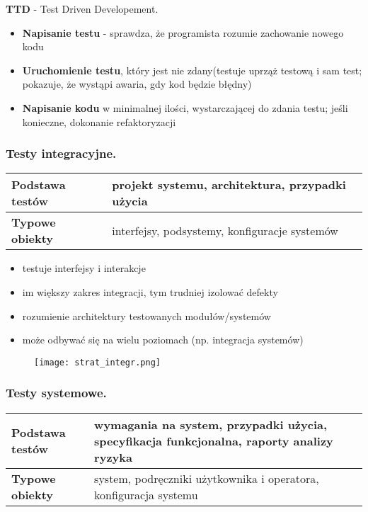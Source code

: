 \documentclass[../main.tex]{subfiles}
\begin{document}
    \textbf{TTD} - Test Driven Developement.
    \begin{itemize}
        \item \textbf{Napisanie testu} - sprawdza, że programista rozumie zachowanie nowego kodu
        \item \textbf{Uruchomienie testu}, który jest nie zdany(testuje uprząż testową i sam test; pokazuje,
        że wystąpi awaria, gdy kod będzie błędny)
        \item \textbf{Napisanie kodu} w minimalnej ilości, wystarczającej do zdania testu; jeśli
        konieczne, dokonanie refaktoryzacji
    \end{itemize}

    \subsubsection{Testy integracyjne.}
    \begin{tabular}{|p{3cm}|p{13cm}|}
        \hline
        \textbf{Podstawa testów} & projekt systemu, architektura, przypadki użycia\\
        \hline
        \textbf{Typowe obiekty} & interfejsy, podsystemy, konfiguracje systemów\\
        \hline
    \end{tabular}

    \begin{itemize}
        \item testuje interfejsy i interakcje
        \item im większy zakres integracji, tym trudniej izolować defekty
        \item rozumienie architektury testowanych modułów/systemów
        \item może odbywać się na wielu poziomach (np. integracja systemów)
    \end{itemize}

    \begin{figure}[H]
        \texttt{[image: strat\_integr.png]}
    \end{figure}

    \subsubsection{Testy systemowe.}
    \begin{tabular}{|p{3cm}|p{13cm}|}
        \hline
        \textbf{Podstawa testów} & wymagania na system, przypadki użycia,
        specyfikacja funkcjonalna, raporty analizy ryzyka\\
        \hline
        \textbf{Typowe obiekty} & system, podręczniki użytkownika i operatora,
        konfiguracja systemu\\
        \hline
    \end{tabular}
\end{document}
